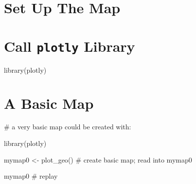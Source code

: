 \documentclass[
  letterpaper,
  DIV=11,
  numbers=noendperiod,
  oneside]{scrreprt}
\newenvironment{Shaded}{\begin{snugshade}}{\end{snugshade}}
\newcommand{\CommentTok}[1]{\textcolor[rgb]{0.37,0.37,0.37}{#1}}
\newcommand{\FunctionTok}[1]{\textcolor[rgb]{0.28,0.35,0.67}{#1}}
\newcommand{\NormalTok}[1]{\textcolor[rgb]{0.00,0.23,0.31}{#1}}
\newcommand{\OtherTok}[1]{\textcolor[rgb]{0.00,0.23,0.31}{#1}}
\begin{document}
\section{Set Up The Map}\label{set-up-the-map}

\section{\texorpdfstring{Call \texttt{plotly}
Library}{Call plotly Library}}\label{call-plotly-library}

\begin{Shaded}
\begin{Highlighting}[]
\FunctionTok{library}\NormalTok{(plotly)}
\end{Highlighting}
\end{Shaded}

\section{A Basic Map}\label{a-basic-map}

\begin{Shaded}
\begin{Highlighting}[]
\CommentTok{\# a very basic map could be created with: }

\FunctionTok{library}\NormalTok{(plotly)}

\NormalTok{mymap0 }\OtherTok{\textless{}{-}} \FunctionTok{plot\_geo}\NormalTok{() }\CommentTok{\# create basic map; read into mymap0}

\NormalTok{mymap0 }\CommentTok{\# replay}
\end{Highlighting}
\end{Shaded}
\end{document}
